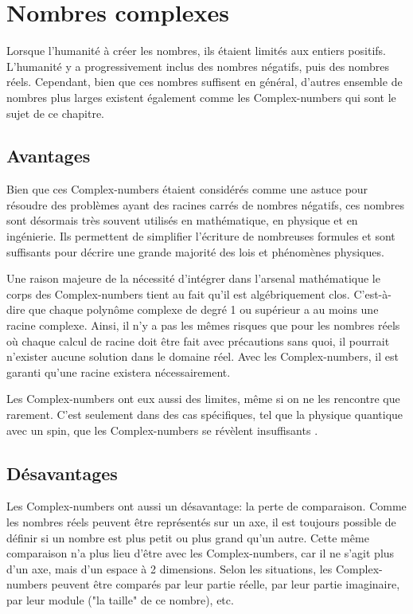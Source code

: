\section{Nombres complexes}

Lorsque l'humanité à créer les nombres, ils étaient limités aux entiers positifs. L'humanité y a progressivement inclus des nombres négatifs, puis des nombres réels. Cependant, bien que ces nombres suffisent en général, d'autres ensemble de nombres plus larges existent également comme les \glspl{Complex-number} qui sont le sujet de ce chapitre.

\subsection{Avantages}

Bien que ces \glspl{Complex-number} étaient considérés comme une astuce pour résoudre des problèmes ayant des racines carrés de nombres négatifs, ces nombres sont désormais très souvent utilisés en mathématique, en physique et en ingénierie. Ils permettent de simplifier l'écriture de nombreuses formules et sont suffisants pour décrire une grande majorité des lois et phénomènes physiques.

Une raison majeure de la nécessité d'intégrer dans l'arsenal mathématique le corps des \glspl{Complex-number} tient au fait qu'il est algébriquement clos. C'est-à-dire que chaque polynôme complexe de degré 1 ou supérieur a au moins une racine complexe. Ainsi, il n'y a pas les mêmes risques que pour les nombres réels où chaque calcul de racine doit être fait avec précautions sans quoi, il pourrait n'exister aucune solution dans le domaine réel. Avec les \glspl{Complex-number}, il est garanti qu'une racine existera nécessairement.

Les \glspl{Complex-number} ont eux aussi des limites, même si on ne les rencontre que rarement. C'est seulement dans des cas spécifiques, tel que la physique quantique avec un spin, que les \glspl{Complex-number} se révèlent insuffisants \cite{spineurs}.

\subsection{Désavantages}

Les \glspl{Complex-number} ont aussi un désavantage: la perte de comparaison. Comme les nombres réels peuvent être représentés sur un axe, il est toujours possible de définir si un nombre est plus petit ou plus grand qu'un autre. Cette même comparaison n'a plus lieu d'être avec les \glspl{Complex-number}, car il ne s'agit plus d'un axe, mais d'un espace à 2 dimensions. Selon les situations, les \glspl{Complex-number} peuvent être comparés par leur partie réelle, par leur partie imaginaire, par leur module ("la taille" de ce nombre), etc.

